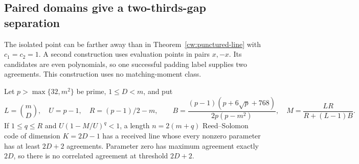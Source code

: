 \subsection{Paired domains give a two-thirds-gap separation}
\label{sec:paired-domain}

The isolated point can be farther away than in
Theorem~\ref{cw:punctured-line} with $c_1=c_2=1$. A second construction
uses evaluation points in pairs $x,-x$. Its candidates are even
polynomials, so one successful padding label supplies two agreements.
This construction uses no matching-moment class.

\begin{lemma}\label{pd:finite}
Let $p>\max\{32,m^2\}$ be prime, $1\le D<m$, and put
\[
 L=\binom mD,\quad U=p-1,\quad R=(p-1)/2-m,\qquad
 B=\frac{(p-1)(p+6\sqrt p+768)}{2p(p-m^2)},\quad
 M=\frac{LR}{R+(L-1)B}.
\]
If $1\le q\le R$ and $U(1-M/U)^q<1$, a length
$n=2(m+q)$ Reed--Solomon code of dimension $K=2D-1$ has a received
line whose every nonzero parameter has at least $2D+2$ agreements.
Parameter zero has maximum agreement exactly $2D$, so there is no
correlated agreement at threshold $2D+2$.
\end{lemma}
